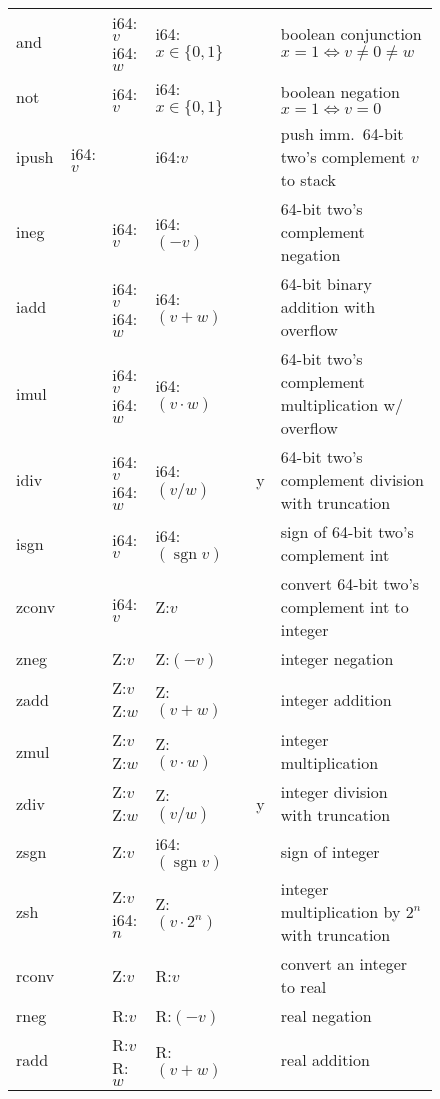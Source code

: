\documentclass[a4paper,parskip=half]{scrartcl}
\begin{document}
\begin{figure}[h]
\begin{tabular}{l|l|l|l@{\;\,\vline\,}c@{\,\vline\,}c@{\,\vline\;\,}l}
  \ttfamily and   &         & i64:$v$ i64:$w$ & i64:$x\in\{0,1\}$ &&& boolean conjunction $x=1\iff v\neq0\neq w$ \\
  \ttfamily not   &         & i64:$v$         & i64:$x\in\{0,1\}$ &&& boolean negation $x=1\iff v=0$ \\
  \hline
  \ttfamily ipush & i64:$v$ &                 & i64:$v$          && & push imm.\ 64-bit two's complement $v$ to stack \\
  \ttfamily ineg  &         & i64:$v$         & i64:$(-v)$       && & 64-bit two's complement negation \\
  \ttfamily iadd  &         & i64:$v$ i64:$w$ & i64:$(v+w)$      && & 64-bit binary addition with overflow \\
  \ttfamily imul  &         & i64:$v$ i64:$w$ & i64:$(v\cdot w)$ && & 64-bit two's complement multiplication w/ overflow \\
  \ttfamily idiv  &         & i64:$v$ i64:$w$ & i64:$(v/w)$      &&y& 64-bit two's complement division with truncation \\
  \ttfamily isgn  &         & i64:$v$         & i64:$(\operatorname{sgn}v)$ &&& sign of 64-bit two's complement int \\
  \hline
  \ttfamily zconv &         & i64:$v$         & Z:$v$            && & convert 64-bit two's complement int to integer \\
  \ttfamily zneg  &         & Z:$v$           & Z:$(-v)$         && & integer negation \\
  \ttfamily zadd  &         & Z:$v$ Z:$w$     & Z:$(v+w)$        && & integer addition \\
  \ttfamily zmul  &         & Z:$v$ Z:$w$     & Z:$(v\cdot w)$   && & integer multiplication \\
  \ttfamily zdiv  &         & Z:$v$ Z:$w$     & Z:$(v/w)$        &&y& integer division with truncation \\
  \ttfamily zsgn  &         & Z:$v$           & i64:$(\operatorname{sgn}v)$ &&& sign of integer \\
  \ttfamily zsh   &         & Z:$v$ i64:$n$   & Z:$(v\cdot2^n)$  && & integer multiplication by $2^n$ with truncation \\
  \hline
  \ttfamily rconv &         & Z:$v$           & R:$v$           & && convert an integer to real \\
  \ttfamily rneg  &         & R:$v$           & R:$(-v)$        & && real negation \\
  \ttfamily radd  &         & R:$v$ R:$w$     & R:$(v+w)$       & && real addition \\

\end{tabular}
\end{figure}
\end{document}
